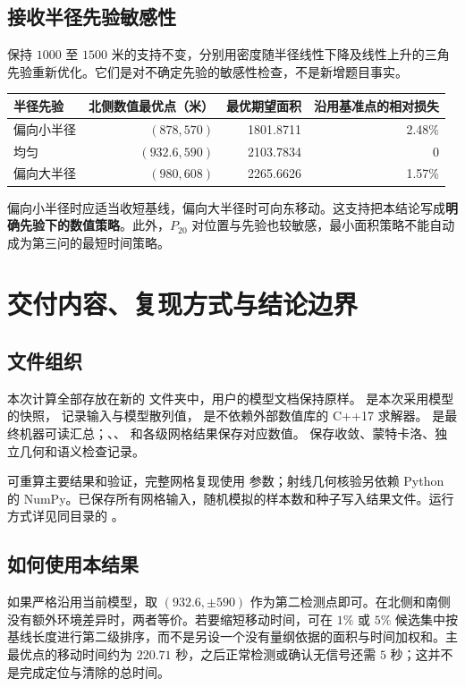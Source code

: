 \documentclass[UTF8,a4paper,zihao=5,fontset=none]{ctexart}
\begin{document}
\subsection{接收半径先验敏感性}
保持 \(1000\) 至 \(1500\) 米的支持不变，分别用密度随半径线性下降及线性上升的三角先验重新优化。它们是对不确定先验的敏感性检查，不是新增题目事实。
\begin{table}[H]\centering\small
\begin{tabular}{lrrr}\toprule
半径先验 & 北侧数值最优点（米） & 最优期望面积 & 沿用基准点的相对损失 \\\midrule
偏向小半径 & \((878,570)\) & 1801.8711 & 2.48\% \\
均匀 & \((932.6,590)\) & 2103.7834 & 0 \\
偏向大半径 & \((980,608)\) & 2265.6626 & 1.57\% \\\bottomrule
\end{tabular}
\end{table}
偏向小半径时应适当收短基线，偏向大半径时可向东移动。这支持把本结论写成\textbf{明确先验下的数值策略}。此外，\(P_{20}\) 对位置与先验也较敏感，最小面积策略不能自动成为第三问的最短时间策略。

\newpage
\section{交付内容、复现方式与结论边界}
\subsection{文件组织}
本次计算全部存放在新的  文件夹中，用户的模型文档保持原样。 是本次采用模型的快照， 记录输入与模型散列值， 是不依赖外部数值库的 C++17 求解器。 是最终机器可读汇总；、、 和各级网格结果保存对应数值。 保存收敛、蒙特卡洛、独立几何和语义检查记录。

 可重算主要结果和验证，完整网格复现使用  参数；射线几何核验另依赖 Python 的 NumPy。已保存所有网格输入，随机模拟的样本数和种子写入结果文件。运行方式详见同目录的 。

\subsection{如何使用本结果}
如果严格沿用当前模型，取 \((932.6,\pm590)\) 作为第二检测点即可。在北侧和南侧没有额外环境差异时，两者等价。若要缩短移动时间，可在 \(1\%\) 或 \(5\%\) 候选集中按基线长度进行第二级排序，而不是另设一个没有量纲依据的面积与时间加权和。主最优点的移动时间约为 \(220.71\) 秒，之后正常检测或确认无信号还需 \(5\) 秒；这并不是完成定位与清除的总时间。
\end{document}

